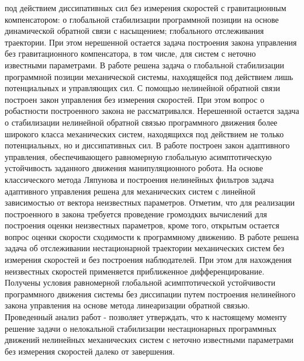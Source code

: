 {под действием диссипативных сил без измерения скоростей с гравитационным компенсатором: о глобальной стабилизации программной позиции на основе динамической обратной связи с насыщением; глобального отслеживания траектории. При этом нерешенной остается задача построения закона управления без гравитационного компенсатора, в том числе, для систем с неточно известными параметрами. В работе \cite{burkov98} решена задача о глобальной стабилизации программной позиции механической системы, находящейся под действием лишь потенциальных и управляющих сил. С помощью нелинейной обратной связи построен закон управления без измерения скоростей. При этом вопрос о робастности построенного закона не рассматривался. Нерешенной остается задача о стабилизации нелинейной обратной связью программного движения более широкого класса механических систем, находящихся под действием не только потенциальных, но и диссипативных сил. В работе \cite{yarza11} построен закон адаптивного управления, обеспечивающего равномерную глобальную асимптотическую устойчивость заданного движения манипуляционного робота. На основе классического метода Ляпунова и построения нелинейных фильтров задача адаптивного управления решена для механических систем с линейной зависимостью от вектора неизвестных параметров. Отметим, что для реализации построенного в \cite{yarza11} закона требуется проведение громоздких вычислений для построения оценки неизвестных параметров, кроме того, открытым остается вопрос оценки скорости сходимости к программному движению. В работе \cite{loria98} решена задача об отслеживании нестационарной траектории механических систем без измерения скоростей и без построения наблюдателей. При этом для нахождения неизвестных скоростей применяется приближенное дифференцирование. Получены условия равномерной глобальной асимптотической устойчивости программного движения системы без диссипации путем построения нелинейного закона управления на основе метода линеаризации обратной 
	связью. Проведенный анализ работ \cite{nicosia90} - \cite{loria98} позволяет утверждать, что к настоящему моменту решение задачи о нелокальной стабилизации нестационарных программных движений нелинейных механических систем с неточно известными параметрами без измерения скоростей далеко от завершения.
	
}
